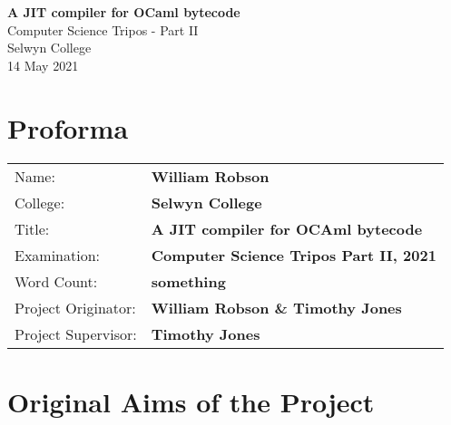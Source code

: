 
\newcommand{\thedate}{14 May 2021}

\begin{titlepage}


    \vspace*{60mm}

    \begin{center}
        \Huge
        \textbf{A JIT compiler for OCaml bytecode} \\[5mm]
        \Large
        Computer Science Tripos - Part II \\[5mm]
        Selwyn College \\[5mm]
        \thedate
    \end{center}

    \cleardoublepage

\end{titlepage}


\section*{Proforma}

 {\large

  \begin{tabular}{ll}
      Name:               & \textbf{William Robson}                        \\
      College:            & \textbf{Selwyn College}                        \\
      Title:              & \textbf{A JIT compiler for OCAml bytecode}     \\
      Examination:        & \textbf{Computer Science Tripos Part II, 2021} \\
      Word Count:         & \textbf{something\footnotemark}
      \\
      Project Originator: & \textbf{William Robson \& Timothy Jones}       \\
      Project Supervisor: & \textbf{Timothy Jones}                         \\
  \end{tabular}
 }
\section*{Original Aims of the Project}

